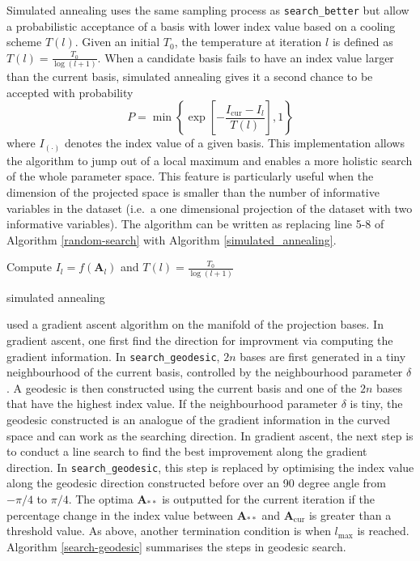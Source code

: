 \documentclass[12pt]{article}
\begin{document}
Simulated annealing
\citep[\citet{bertsimas1993simulated}]{kirkpatrick1983optimization} uses
the same sampling process as \texttt{search\_better} but allow a
probabilistic acceptance of a basis with lower index value based on a
cooling scheme \(T(l)\). Given an initial \(T_0\), the temperature at
iteration \(l\) is defined as \(T(l) = \frac{T_0}{\log(l + 1)}\). When a
candidate basis fails to have an index value larger than the current
basis, simulated annealing gives it a second chance to be accepted with
probability
\[P= \min\left\{\exp\left[-\frac{I_{\text{cur}} - I_{l}}{T(l)}\right],1\right\}\]
where \(I_{(\cdot)}\) denotes the index value of a given basis. This
implementation allows the algorithm to jump out of a local maximum and
enables a more holistic search of the whole parameter space. This
feature is particularly useful when the dimension of the projected space
is smaller than the number of informative variables in the dataset
(i.e.~a one dimensional projection of the dataset with two informative
variables). The algorithm can be written as replacing line 5-8 of
Algorithm \ref{random-search} with Algorithm \ref{simulated_annealing}.

\begin{algorithm}
\SetAlgoLined
    Compute $I_{l} = f(\mathbf{A}_{l})$ and $T(l) = \frac{T_0}{\log(l + 1)}$\;
  \caption{simulated annealing}
  \label{simulated_annealing}
\end{algorithm}

\citet{cook1995grand} used a gradient ascent algorithm on the manifold
of the projection bases. In gradient ascent, one first find the
direction for improvment via computing the gradient information. In
\texttt{search\_geodesic}, \(2n\) bases are first generated in a tiny
neighbourhood of the current basis, controlled by the neighbourhood
parameter \(\delta\). A geodesic is then constructed using the current
basis and one of the \(2n\) bases that have the highest index value. If
the neighbourhood parameter \(\delta\) is tiny, the geodesic constructed
is an analogue of the gradient information in the curved space and can
work as the searching direction. In gradient ascent, the next step is to
conduct a line search to find the best improvement along the gradient
direction. In \texttt{search\_geodesic}, this step is replaced by
optimising the index value along the geodesic direction constructed
before over an 90 degree angle from \(-\pi/4\) to \(\pi/4\). The optima
\(\mathbf{A}_{**}\) is outputted for the current iteration if the
percentage change in the index value between \(\mathbf{A}_{**}\) and
\(\mathbf{A}_{\text{cur}}\) is greater than a threshold value. As above,
another termination condition is when \(l_{\max}\) is reached. Algorithm
\ref{search-geodesic} summarises the steps in geodesic search.
\end{document}
